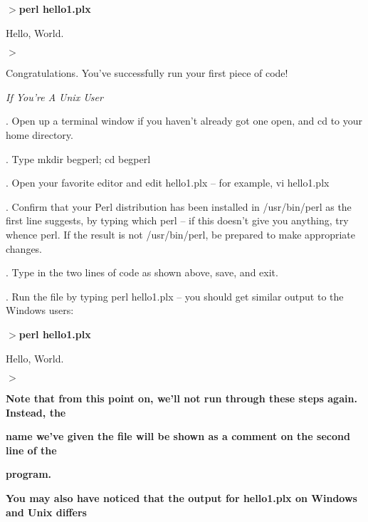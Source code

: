 \documentclass[a4paper,11pt]{book}
\begin{document}
\noindent 

\noindent $>$\textbf{perl hello1.plx}

\noindent Hello, World.

\noindent 

\noindent $>$

\noindent 

\noindent Congratulations. You've successfully run your first piece of code!

\noindent 

\noindent \textit{If You're A Unix User}

.   Open up a terminal window if you haven't already got one open, and cd to your home directory.

\noindent 

.   Type mkdir begperl; cd begperl

\noindent 

.   Open your favorite editor and edit hello1.plx -- for example, vi hello1.plx

\noindent 

.   Confirm that your Perl distribution has been installed in /usr/bin/perl as the first line suggests, by typing which perl -- if this doesn't give you anything, try whence perl. If the result is not /usr/bin/perl, be prepared to make appropriate changes.

\noindent 

.   Type in the two lines of code as shown above, save, and exit.

\noindent 

.   Run the file by typing perl hello1.plx -- you should get similar output to the Windows users:

\noindent 

\noindent $>$\textbf{perl hello1.plx}

\noindent Hello, World.

\noindent $>$

\noindent 

\noindent 

\noindent \textbf{Note that from this point on, we'll not run through these steps again. Instead, the}

\noindent \textbf{name we've given the file will be shown as a comment on the second line of the}

\noindent \textbf{program.}

\noindent 

\noindent \textbf{You may also have noticed that the output for hello1.plx on Windows and Unix differs}
\end{document}
